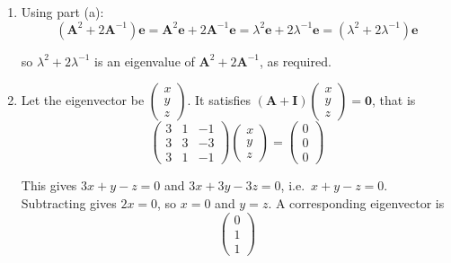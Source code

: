 \documentclass[leqno]{article}
\begin{document}
\begin{enumerate}[
  label=\textbf{\arabic*.},
  leftmargin=*,
  topsep=0pt,
  partopsep=0pt,
  parsep=0pt
]
\begin{djsSolution}
\begin{enumerate}[label=\textbf{(\alph*)}, start=1]
so \(\lambda^2\) is an eigenvalue of \(\mathbf{A}^2\) with corresponding eigenvector \(\mathbf{e}\).

If \(\lambda=0\), then \(\mathbf{A}\mathbf{e}=\mathbf{0}\), so \(\mathbf{e}=\mathbf{A}^{-1}\mathbf{0}=\mathbf{0}\), a contradiction. Hence \(\lambda\neq0\). Premultiplying \(\mathbf{A}\mathbf{e}=\lambda\mathbf{e}\) by \(\mathbf{A}^{-1}\):
\[
\mathbf{e}=\lambda\mathbf{A}^{-1}\mathbf{e}\quad\Longrightarrow\quad \mathbf{A}^{-1}\mathbf{e}=\lambda^{-1}\mathbf{e}
\]

so \(\lambda^{-1}\) is an eigenvalue of \(\mathbf{A}^{-1}\) with corresponding eigenvector \(\mathbf{e}\).

  \item Using part (a):
\[
\left(\mathbf{A}^2+2\mathbf{A}^{-1}\right)\mathbf{e}=\mathbf{A}^2\mathbf{e}+2\mathbf{A}^{-1}\mathbf{e}=\lambda^2\mathbf{e}+2\lambda^{-1}\mathbf{e}=\left(\lambda^2+2\lambda^{-1}\right)\mathbf{e}
\]

so \(\lambda^2+2\lambda^{-1}\) is an eigenvalue of \(\mathbf{A}^2+2\mathbf{A}^{-1}\), as required.

  \item Let the eigenvector be \(\begin{pmatrix}x\\y\\z\end{pmatrix}\). It satisfies \((\mathbf{A}+\mathbf{I})\begin{pmatrix}x\\y\\z\end{pmatrix}=\mathbf{0}\), that is
\[
\begin{pmatrix} 3 & 1 & -1 \\ 3 & 3 & -3 \\ 3 & 1 & -1 \end{pmatrix}\begin{pmatrix}x\\y\\z\end{pmatrix}=\begin{pmatrix}0\\0\\0\end{pmatrix}
\]

This gives \(3x+y-z=0\) and \(3x+3y-3z=0\), i.e.\ \(x+y-z=0\). Subtracting gives \(2x=0\), so \(x=0\) and \(y=z\). A corresponding eigenvector is
\[
\begin{pmatrix}0\\1\\1\end{pmatrix}
\]


\end{enumerate}
\end{djsSolution}
\end{enumerate}
\end{document}
